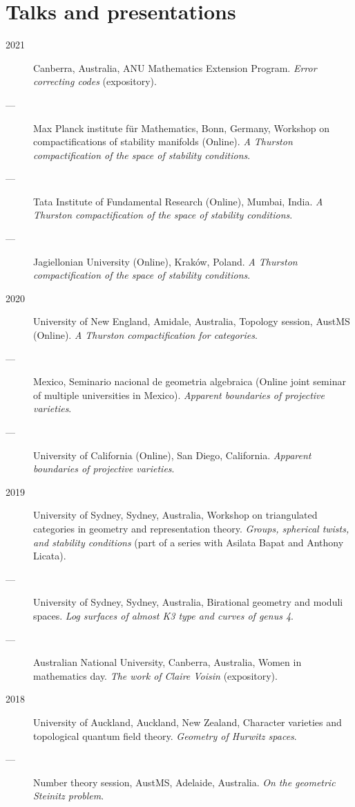 \documentclass[11pt]{article}
\begin{document}
\section*{Talks and presentations}
\label{sec:org293114e}
\begin{description}
\item[{2021}] Canberra, Australia, ANU Mathematics Extension Program. \emph{Error correcting codes} (expository).
\item[{---}] Max Planck institute für Mathematics, Bonn, Germany, Workshop on compactifications of stability manifolds (Online). \emph{A Thurston compactification of the space of stability conditions}.
\item[{---}] Tata Institute of Fundamental Research (Online), Mumbai, India. \emph{A Thurston compactification of the space of stability conditions}.
\item[{---}] Jagiellonian University (Online), Kraków, Poland. \emph{A Thurston compactification of the space of stability conditions}.
\item[{2020}] University of New England, Amidale, Australia, Topology session, AustMS (Online). \emph{A Thurston compactification for categories}.
\item[{---}] Mexico, Seminario nacional de geometria algebraica (Online joint seminar of multiple universities in Mexico). \emph{Apparent boundaries of projective varieties}.
\item[{---}] University of California (Online), San Diego, California. \emph{Apparent boundaries of projective varieties}.
\item[{2019}] University of Sydney, Sydney, Australia, Workshop on triangulated categories in geometry and representation theory. \emph{Groups, spherical twists, and stability conditions} (part of a series with Asilata Bapat and Anthony Licata).
\item[{---}] University of Sydney, Sydney, Australia, Birational geometry and moduli spaces. \emph{Log surfaces of almost K3 type and curves of genus 4}.
\item[{---}] Australian National University, Canberra, Australia, Women in mathematics day. \emph{The work of Claire Voisin} (expository).
\item[{2018}] University of Auckland, Auckland, New Zealand, Character varieties and topological quantum field theory. \emph{Geometry of Hurwitz spaces}.
\item[{---}] Number theory session,  AustMS, Adelaide, Australia. \emph{On the geometric Steinitz problem}.

\end{description}
\end{document}
